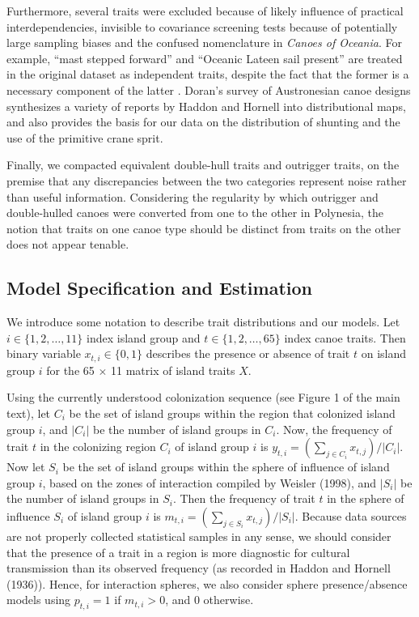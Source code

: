 Furthermore, several traits were excluded because of likely influence of practical interdependencies, invisible to covariance screening tests because of potentially large sampling biases and the confused nomenclature in \textit{Canoes of Oceania}.  For example, ``mast stepped forward'' and ``Oceanic Lateen sail present'' are treated in the original dataset as independent traits, despite the fact that the former is a necessary component of the latter \citep{Doran1981canoes}.  Doran's survey of Austronesian canoe designs synthesizes a variety of reports by Haddon and Hornell into distributional maps, and also provides the basis for our data on the distribution of shunting and the use of the primitive crane sprit.      

Finally, we compacted equivalent double-hull traits and outrigger traits, on the premise that any discrepancies between the two categories represent noise rather than useful information.  Considering the regularity by which outrigger and double-hulled canoes were converted from one to the other in Polynesia, the notion that traits on one canoe type should be distinct from traits on the other does not appear tenable.


\subsection{Model Specification and Estimation}

We introduce some notation to describe trait distributions and our models. Let $i \in \{1,2, \dots ,11\}$ index island group and $t \in \{1,2,\dots,65\}$ index canoe traits. Then binary variable $x_{t,i} \in \{0,1\}$ describes the presence or absence of trait $t$ on island group $i$ for the 65 $\times$ 11 matrix of island traits $X$.

Using the currently understood colonization sequence (see Figure 1 of the main text), let $C_i$ be the set of island groups within the region that colonized island group $i$, and $|C_i|$ be the number of island groups in $C_i$. Now, the frequency of trait $t$ in the colonizing region $C_i$ of island group $i$ is $y_{t,i} = \left( \sum_{j \in C_i} x_{t,j} \right) / |C_i|$. Now let $S_i$ be the set of island groups within the sphere of influence of island group $i$, based on the zones of interaction compiled by Weisler (1998), and $|S_i|$ be the number of island groups in $S_i$. Then the frequency of trait $t$ in the sphere of influence $S_i$ of island group $i$ is $m_{t,i}= \left(\sum_{j \in S_i} x_{t,j} \right) / |S_i|$. Because data sources are not properly collected statistical samples in any sense, we should consider that the presence of a trait in a region is more diagnostic for cultural transmission than its observed frequency (as recorded in Haddon and Hornell (1936)). Hence, for interaction spheres, we also consider sphere presence/absence models using $p_{t,i}= 1$ if $m_{t,i}>0$, and $0$ otherwise.

